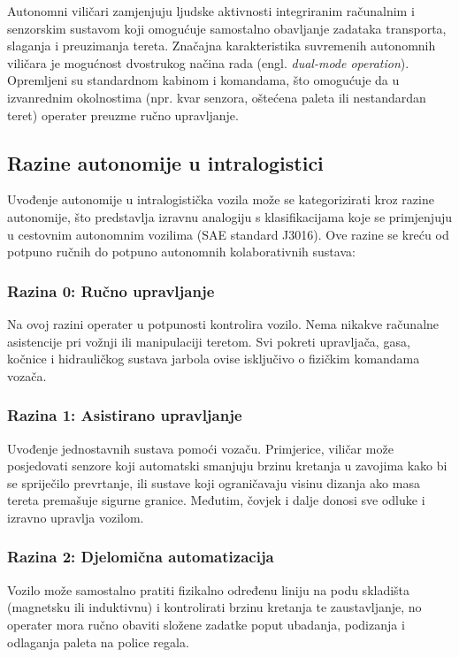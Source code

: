 \documentclass[12pt,a4paper]{article}
\begin{document}
Autonomni viličari zamjenjuju ljudske aktivnosti integriranim računalnim i senzorskim sustavom koji omogućuje samostalno obavljanje zadataka transporta, slaganja i preuzimanja tereta. Značajna karakteristika suvremenih autonomnih viličara je mogućnost dvostrukog načina rada (engl. \textit{dual-mode operation}). Opremljeni su standardnom kabinom i komandama, što omogućuje da u izvanrednim okolnostima (npr. kvar senzora, oštećena paleta ili nestandardan teret) operater preuzme ručno upravljanje.

\subsection{Razine autonomije u intralogistici}
Uvođenje autonomije u intralogistička vozila može se kategorizirati kroz razine autonomije, što predstavlja izravnu analogiju s klasifikacijama koje se primjenjuju u cestovnim autonomnim vozilima (SAE standard J3016). Ove razine se kreću od potpuno ručnih do potpuno autonomnih kolaborativnih sustava:

\subsubsection{Razina 0: Ručno upravljanje}
Na ovoj razini operater u potpunosti kontrolira vozilo. Nema nikakve računalne asistencije pri vožnji ili manipulaciji teretom. Svi pokreti upravljača, gasa, kočnice i hidrauličkog sustava jarbola ovise isključivo o fizičkim komandama vozača.

\subsubsection{Razina 1: Asistirano upravljanje}
Uvođenje jednostavnih sustava pomoći vozaču. Primjerice, viličar može posjedovati senzore koji automatski smanjuju brzinu kretanja u zavojima kako bi se spriječilo prevrtanje, ili sustave koji ograničavaju visinu dizanja ako masa tereta premašuje sigurne granice. Međutim, čovjek i dalje donosi sve odluke i izravno upravlja vozilom.

\subsubsection{Razina 2: Djelomična automatizacija}
Vozilo može samostalno pratiti fizikalno određenu liniju na podu skladišta (magnetsku ili induktivnu) i kontrolirati brzinu kretanja te zaustavljanje, no operater mora ručno obaviti složene zadatke poput ubadanja, podizanja i odlaganja paleta na police regala.
\end{document}
